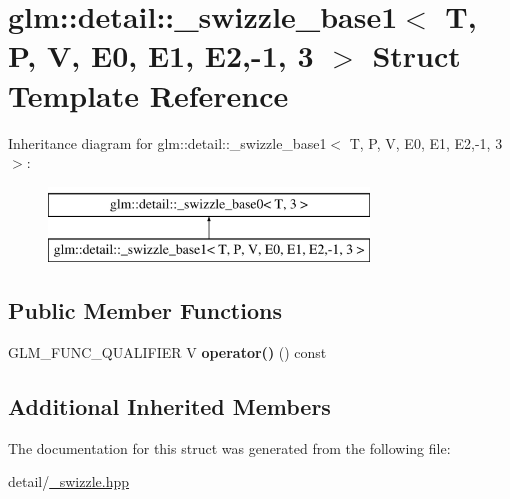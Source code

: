 \hypertarget{structglm_1_1detail_1_1__swizzle__base1_3_01T_00_01P_00_01V_00_01E0_00_01E1_00_01E2_00-1_00_013_01_4}{\section{glm\-:\-:detail\-:\-:\-\_\-swizzle\-\_\-base1$<$ T, P, V, E0, E1, E2,-\/1, 3 $>$ Struct Template Reference}
\label{structglm_1_1detail_1_1__swizzle__base1_3_01T_00_01P_00_01V_00_01E0_00_01E1_00_01E2_00-1_00_013_01_4}
}
Inheritance diagram for glm\-:\-:detail\-:\-:\-\_\-swizzle\-\_\-base1$<$ T, P, V, E0, E1, E2,-\/1, 3 $>$\-:\begin{figure}[H]
\begin{center}
\leavevmode
\includegraphics[height=2.000000cm]{structglm_1_1detail_1_1__swizzle__base1_3_01T_00_01P_00_01V_00_01E0_00_01E1_00_01E2_00-1_00_013_01_4}
\end{center}
\end{figure}
\subsection*{Public Member Functions}
\begin{DoxyCompactItemize}
\item 
\hypertarget{structglm_1_1detail_1_1__swizzle__base1_3_01T_00_01P_00_01V_00_01E0_00_01E1_00_01E2_00-1_00_013_01_4_a94510ce33bf6a19e28b4f95f4e715807}{G\-L\-M\-\_\-\-F\-U\-N\-C\-\_\-\-Q\-U\-A\-L\-I\-F\-I\-E\-R V {\bfseries operator()} () const }\label{structglm_1_1detail_1_1__swizzle__base1_3_01T_00_01P_00_01V_00_01E0_00_01E1_00_01E2_00-1_00_013_01_4_a94510ce33bf6a19e28b4f95f4e715807}

\end{DoxyCompactItemize}
\subsection*{Additional Inherited Members}


The documentation for this struct was generated from the following file\-:\begin{DoxyCompactItemize}
\item 
detail/\hyperlink{__swizzle_8hpp}{\-\_\-swizzle.\-hpp}\end{DoxyCompactItemize}
